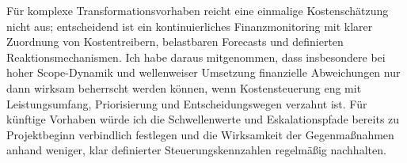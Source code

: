 \par Für komplexe Transformationsvorhaben reicht eine einmalige Kostenschätzung nicht aus; entscheidend ist ein kontinuierliches Finanzmonitoring mit klarer Zuordnung von Kostentreibern, belastbaren Forecasts und definierten Reaktionsmechanismen. Ich habe daraus mitgenommen, dass insbesondere bei hoher Scope-Dynamik und wellenweiser Umsetzung finanzielle Abweichungen nur dann wirksam beherrscht werden können, wenn Kostensteuerung eng mit Leistungsumfang, Priorisierung und Entscheidungswegen verzahnt ist. Für künftige Vorhaben würde ich die Schwellenwerte und Eskalationspfade bereits zu Projektbeginn verbindlich festlegen und die Wirksamkeit der Gegenmaßnahmen anhand weniger, klar definierter Steuerungskennzahlen regelmäßig nachhalten.